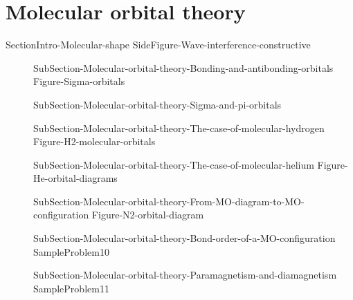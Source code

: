 \documentclass[main.tex]{subfiles}
\begin{document}
\section{Molecular orbital theory}
{SectionIntro-Molecular-shape} 
{SideFigure-Wave-interference-constructive}	
\sloppy\begin{description}
\item[] {SubSection-Molecular-orbital-theory-Bonding-and-antibonding-orbitals}
{Figure-Sigma-orbitals}  
\vspace{1cm}{SideFigure-Wave-interference-destructive} \vspace{3cm}
\item[] 
{SubSection-Molecular-orbital-theory-Sigma-and-pi-orbitals}
\vspace{-1cm}{Figure-Pi-orbitals}
\item[] {SubSection-Molecular-orbital-theory-The-case-of-molecular-hydrogen}
{Figure-H2-molecular-orbitals}
\item[] {SubSection-Molecular-orbital-theory-The-case-of-molecular-helium}
{Figure-He-orbital-diagrams}
\item[] {SubSection-Molecular-orbital-theory-From-MO-diagram-to-MO-configuration}
{Figure-N2-orbital-diagram}
\item[] {SubSection-Molecular-orbital-theory-Bond-order-of-a-MO-configuration}
{SampleProblem10}
\item[] {SubSection-Molecular-orbital-theory-Paramagnetism-and-diamagnetism}
{SampleProblem11}
\end{description}
\end{document}
